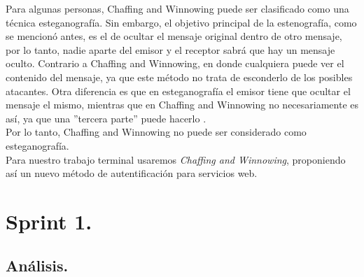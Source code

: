 \documentclass[12pt, a4paper, titlepage]{report}
\begin{document}
        Para algunas personas, Chaffing and Winnowing puede ser clasificado como una técnica esteganograf\'ia. Sin embargo, el objetivo principal de la estenografía, como se mencionó antes, es el de ocultar el mensaje original dentro de otro mensaje, por lo tanto, nadie aparte del emisor y el receptor sabrá que hay un mensaje oculto. Contrario a Chaffing and Winnowing, en donde cualquiera puede ver el contenido del mensaje, ya que este método no trata de esconderlo de los posibles atacantes. Otra diferencia es que en esteganograf\'ia el emisor tiene que ocultar el mensaje el mismo, mientras que en Chaffing and Winnowing no necesariamente es así, ya que una ''tercera parte'' puede hacerlo \cite{refChaffingVsEsteganografia}.\\
        
        Por lo tanto, Chaffing and Winnowing no puede ser considerado como esteganograf\'ia.\\
        
         Para nuestro trabajo terminal usaremos \textit{Chaffing and Winnowing}, proponiendo así un nuevo método de autentificación para servicios web. \\

    \part{Sprint 1.}
    
	\chapter{\textcolor{azulescom}{Análisis.}}
	    
\end{document}
